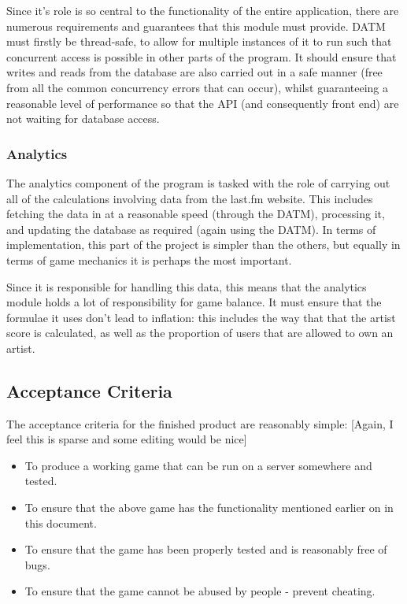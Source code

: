 \documentclass[a4paper,10pt,twoside]{article}
\begin{document}
Since it's role is so central to the functionality of the entire application, there are numerous requirements and guarantees that this module must provide. DATM must firstly be thread-safe, to allow for multiple instances of it to run such that concurrent access is possible in other parts of the program. It should ensure that writes and reads from the database are also carried out in a safe manner (free from all the common concurrency errors that can occur), whilst guaranteeing a reasonable level of performance so that the API (and consequently front end) are not waiting for database access. 

\subsubsection{Analytics}

The analytics component of the program is tasked with the role of carrying out all of the calculations involving data from the last.fm website. This includes fetching the data in at a reasonable speed (through the DATM), processing it, and updating the database as required (again using the DATM). In terms of implementation, this part of the project is simpler than the others, but equally in terms of game mechanics it is perhaps the most important.

Since it is responsible for handling this data, this means that the analytics module holds a lot of responsibility for game balance. It must ensure that the formulae it uses don't lead to inflation: this includes the way that that the artist score is calculated, as well as the proportion of users that are allowed to own an artist.

\subsection{Acceptance Criteria}

The acceptance criteria for the finished product are reasonably simple: [Again, I feel this is sparse and some editing would be nice]

\begin{itemize}
\item To produce a working game that can be run on a server somewhere and tested.
\item To ensure that the above game has the functionality mentioned earlier on in this document.
\item To ensure that the game has been properly tested and is reasonably free of bugs.
\item To ensure that the game cannot be abused by people - prevent cheating.
\end{itemize}
\end{document}
